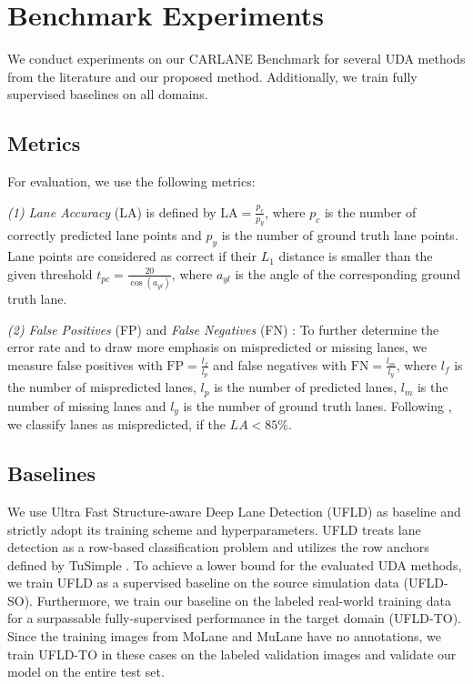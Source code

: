 \documentclass{article}
\begin{document}
	\section{Benchmark Experiments}
	\label{sec:Experiments}
	We conduct experiments on our CARLANE Benchmark for several UDA methods from the literature and our proposed method. Additionally, we train fully supervised baselines on all domains.
	
	\subsection{Metrics}
	For evaluation, we use the following metrics:
	
	\textit{(1) Lane Accuracy} (LA) \cite{qin2020ultra} is defined by $\textrm{LA} = \frac{p_{c}}{p_{y}}$, where $p_c$ is the number of correctly predicted lane points and $p_{y}$ is the number of ground truth lane points. Lane points are considered as correct if their $L_1$ distance is smaller than the given threshold $t_{pc}=\frac{20}{\cos(a_{yl})}$, where $a_{yl}$ is the angle of the corresponding ground truth lane.
	
	\textit{(2) False Positives} (FP) and \textit{False Negatives} (FN) \cite{qin2020ultra}: To further determine the error rate and to draw more emphasis on mispredicted or missing lanes, we measure false positives with $\textrm{FP}=\frac{l_{f}}{l_p}$ and false negatives with $\textrm{FN}=\frac{l_m}{l_{y}}$, where $l_{f}$ is the number of mispredicted lanes, $l_p$ is the number of predicted lanes, $l_{m}$ is the number of missing lanes and $l_{y}$ is the number of ground truth lanes. Following \cite{qin2020ultra}, we classify lanes as mispredicted, if the $LA < 85\%$. 
	
	\subsection{Baselines}
	We use Ultra Fast Structure-aware Deep Lane Detection (UFLD) \cite{qin2020ultra} as baseline and strictly adopt its training scheme and hyperparameters. UFLD treats lane detection as a row-based classification problem and utilizes the row anchors defined by TuSimple \cite{TuSimple2017}.
	To achieve a lower bound for the evaluated UDA methods, we train UFLD as a supervised baseline on the source simulation data (UFLD-SO). Furthermore, we train our baseline on the labeled real-world training data for a surpassable fully-supervised performance in the target domain (UFLD-TO). Since the training images from MoLane and MuLane have no annotations, we train UFLD-TO in these cases on the labeled validation images and validate our model on the entire test set.
	
\end{document}

